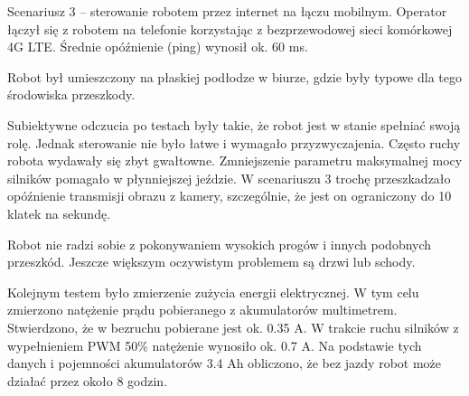 Scenariusz 3 -- sterowanie robotem przez internet na łączu mobilnym.
Operator łączył się z robotem na telefonie korzystając z bezprzewodowej sieci komórkowej 4G LTE.
Średnie opóźnienie (ping) wynosił ok. 60 ms.

Robot był umieszczony na płaskiej podłodze w biurze, gdzie były typowe dla tego środowiska przeszkody.

Subiektywne odczucia po testach były takie, że robot jest w stanie spełniać swoją rolę.
Jednak sterowanie nie było łatwe i wymagało przyzwyczajenia.
Często ruchy robota wydawały się zbyt gwałtowne.
Zmniejszenie parametru maksymalnej mocy silników pomagało w płynniejszej jeździe.
W scenariuszu 3 trochę przeszkadzało opóźnienie transmisji obrazu z kamery, szczególnie, że jest on ograniczony do 10 klatek na sekundę.

Robot nie radzi sobie z pokonywaniem wysokich progów i innych podobnych przeszkód.
Jeszcze większym oczywistym problemem są drzwi lub schody.

Kolejnym testem było zmierzenie zużycia energii elektrycznej.
W tym celu zmierzono natężenie prądu pobieranego z akumulatorów multimetrem.
Stwierdzono, że w bezruchu pobierane jest ok. 0.35 A.
W trakcie ruchu silników z wypełnieniem PWM 50\% natężenie wynosiło ok. 0.7 A.
Na podstawie tych danych i pojemności akumulatorów 3.4 Ah obliczono, że bez jazdy robot może działać przez około 8 godzin.